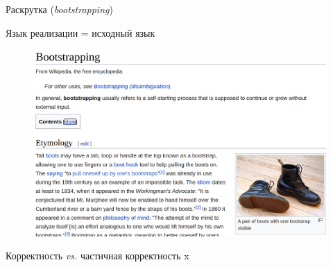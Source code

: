 \documentclass[aspectratio=43]{beamer}
\begin{document}
\begin{frame}[fragile]{Раскрутка (\emph{bootstrapping})}
  \begin{center}
       Язык реализации = исходный язык
    \begin{figure}
      \includegraphics[scale=0.2]{images/bootstrapping.png}
    \end{figure}
  \end{center}
\end{frame}

\begin{frame}[fragile]{Корректность \emph{vs.} частичная корректность}
x
\end{frame}
\end{document}
